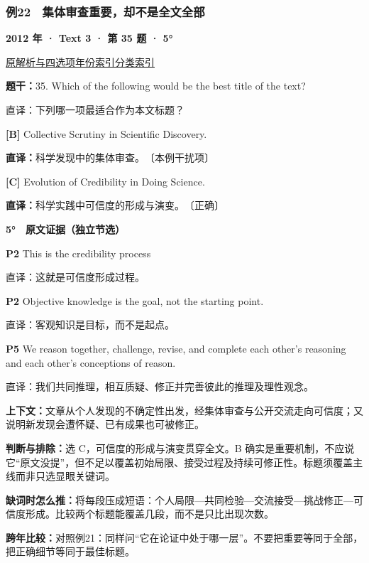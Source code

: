 \documentclass[11pt,a4paper]{article}
\begin{document}
\subsubsection{例22　集体审查重要，却不是全文全部}\label{case-2012-T3-Q35}
\noindent\textbf{2012 年 · Text 3 · 第 35 题 · 5°}\par\noindent \href{https://zj139.github.io/math-notes/english/8d32b42b276b1ab633d587b6/\#q35}{原解析与四选项}\quad \hyperref[idx-2012-T3-Q35]{年份索引}\quad \hyperref[class-R11]{分类索引}\par\smallskip
\noindent\textbf{题干：}35. Which of the following would be the best title of the text?\par
直译：下列哪一项最适合作为本文标题？\par
{}\noindent\textbf{[B]} Collective Scrutiny in Scientific Discovery.\par\nopagebreak
\noindent\textbf{直译：}科学发现中的集体审查。　〔本例干扰项〕\par
{}\noindent\textbf{[C]} Evolution of Credibility in Doing Science.\par\nopagebreak
\noindent\textbf{直译：}科学实践中可信度的形成与演变。　〔正确〕\par
\begin{evidence}\textbf{5°　原文证据（独立节选）}\par
\textbf{P2} This is the credibility process\par 直译：这就是可信度形成过程。\par
\textbf{P2} Objective knowledge is the goal, not the starting point.\par 直译：客观知识是目标，而不是起点。\par
\textbf{P5} We reason together, challenge, revise, and complete each other's reasoning and each other's conceptions of reason.\par 直译：我们共同推理，相互质疑、修正并完善彼此的推理及理性观念。\par
\end{evidence}
\noindent\textbf{上下文：}文章从个人发现的不确定性出发，经集体审查与公开交流走向可信度；又说明新发现会遭怀疑、已有成果也可被修正。\par
\noindent\textbf{判断与排除：}选 C，可信度的形成与演变贯穿全文。B 确实是重要机制，不应说它“原文没提”，但不足以覆盖初始局限、接受过程及持续可修正性。标题须覆盖主线而非只选显眼关键词。\par
\noindent\textbf{缺词时怎么推：}将每段压成短语：个人局限—共同检验—交流接受—挑战修正—可信度形成。比较两个标题能覆盖几段，而不是只比出现次数。\par
\noindent\textbf{跨年比较：}对照例21：同样问“它在论证中处于哪一层”。不要把重要等同于全部，把正确细节等同于最佳标题。\par
\clearpage
\end{document}
